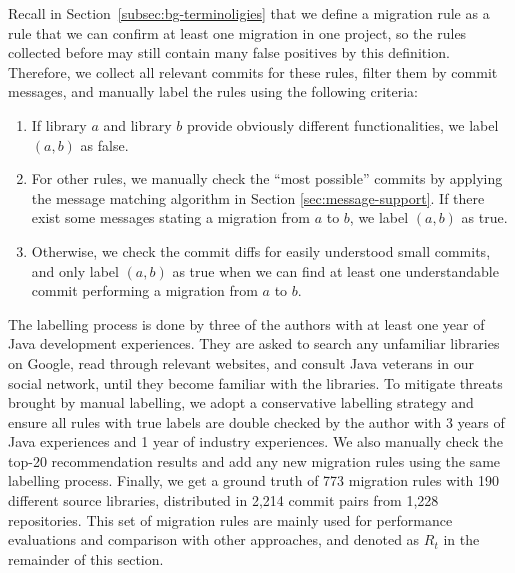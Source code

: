 \documentclass[conference, 10pt]{IEEEtran}
\begin{document}
Recall in Section~\ref{subsec:bg-terminoligies} that we define a migration rule as a rule that we can confirm at least one migration in one project, so the rules collected before may still contain many false positives by this definition. 
Therefore, we %
collect all relevant commits for these rules, filter them by commit messages, and manually label the rules using the following criteria:
\begin{enumerate}
    \item If library $a$ and library $b$ provide obviously different functionalities, we label $(a,b)$ as false.
    \item For other rules, we manually check the ``most possible'' commits by applying the message matching algorithm in Section \ref{sec:message-support}. If there exist some messages stating a migration from $a$ to $b$, we label $(a,b)$ as true.
    \item Otherwise, we check the commit diffs for easily understood small commits, and only label $(a,b)$ as true when we can find at least one understandable commit performing a migration from $a$ to $b$.
\end{enumerate}
The labelling process is done by three of the authors with at least one year of Java development experiences.
They are asked to search any unfamiliar libraries on Google, read through relevant websites, and consult Java veterans in our social network, until they become familiar with the libraries.
To mitigate threats brought by manual labelling, we adopt a conservative labelling strategy and ensure all rules with true labels are double checked by the author with 3 years of Java experiences and 1 year of industry experiences.
We also manually check the top-20 recommendation results and add any new migration rules using the same labelling process.
Finally, we get a ground truth of 773 migration rules with 190 different source libraries, distributed in 2,214 commit pairs from 1,228 repositories. This set of migration rules are mainly used for performance evaluations and comparison with other approaches, and denoted as $R_t$ in the remainder of this section.
\end{document}

